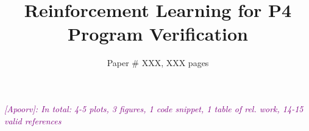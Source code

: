 \documentclass[sigconf]{acmart}
\newcommand{\ap}[1]{\textit{\textcolor{purple}{[Apoorv]: #1}}}
\begin{document}
\title{Reinforcement Learning for P4 Program Verification}


\author{Paper \# XXX, XXX pages}

\renewcommand{\shortauthors}{X.et al.}
\begin{abstract}

\end{abstract}

\maketitle

%
%

\ap{In total: 4-5 plots, 3 figures, 1 code snippet, 1 table of rel. work, 14-15 valid references}










\end{document}
